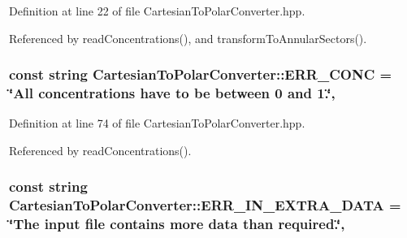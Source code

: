 Definition at line 22 of file Cartesian\-To\-Polar\-Converter.\-hpp.



Referenced by read\-Concentrations(), and transform\-To\-Annular\-Sectors().

\hypertarget{classmultiscale_1_1video_1_1CartesianToPolarConverter_a2657e7972c2d3f7cc4c0011ccd8423e4}{
\subsubsection[{E\-R\-R\-\_\-\-C\-O\-N\-C}]{\setlength{\rightskip}{0pt plus 5cm}const string Cartesian\-To\-Polar\-Converter\-::\-E\-R\-R\-\_\-\-C\-O\-N\-C = \char`\"{}All {\bf concentrations} have to be between 0 and 1.\char`\"{}\hspace{0.3cm}{\ttfamily [static]}, {\ttfamily [private]}}}\label{classmultiscale_1_1video_1_1CartesianToPolarConverter_a2657e7972c2d3f7cc4c0011ccd8423e4}


Definition at line 74 of file Cartesian\-To\-Polar\-Converter.\-hpp.



Referenced by read\-Concentrations().

\hypertarget{classmultiscale_1_1video_1_1CartesianToPolarConverter_a27c4664c63c53cc5351bbb3233bdfce1}{
\subsubsection[{E\-R\-R\-\_\-\-I\-N\-\_\-\-E\-X\-T\-R\-A\-\_\-\-D\-A\-T\-A}]{\setlength{\rightskip}{0pt plus 5cm}const string Cartesian\-To\-Polar\-Converter\-::\-E\-R\-R\-\_\-\-I\-N\-\_\-\-E\-X\-T\-R\-A\-\_\-\-D\-A\-T\-A = \char`\"{}The input file contains more data than required.\char`\"{}\hspace{0.3cm}{\ttfamily [static]}, {\ttfamily [private]}}}\label{classmultiscale_1_1video_1_1CartesianToPolarConverter_a27c4664c63c53cc5351bbb3233bdfce1}


